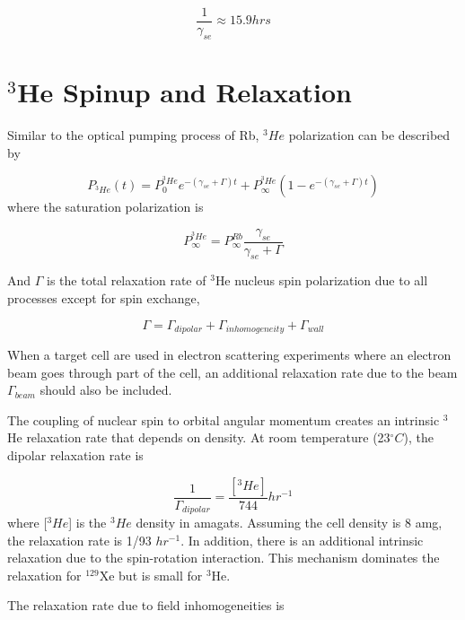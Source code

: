 \begin{equation}
\frac{1}{\gamma_{se}}\approx 15.9 hrs
\end{equation}

\section{$^{3}$He Spinup and Relaxation}

Similar to the optical pumping process of Rb, $^{3}He$ polarization can be described by

\begin{equation}
P_{^{3}He}(t)=P_{0}^{^{3}He}e^{-(\gamma_{se}+\Gamma)t}+P_{\infty}^{^{3}He}(1-e^{-(\gamma_{se}+\Gamma)t})
\end{equation}
where the saturation polarization is

\begin{equation}
P_{\infty}^{^{3}He}=P_{\infty}^{Rb}\frac{\gamma_{se}}{\gamma_{se}+\Gamma}
\end{equation}

And $\Gamma$ is the total relaxation rate of $^{3}$He nucleus spin polarization due to all processes except for spin exchange,

\begin{equation}
\Gamma=\Gamma_{dipolar}+\Gamma_{inhomogeneity}+\Gamma_{wall}
\end{equation}

When a target cell are used in electron scattering experiments where an electron beam goes through part of the cell, an additional relaxation rate due to the beam $\Gamma_{beam}$ should also be included.

The coupling of nuclear spin to orbital angular momentum creates an intrinsic $^{3}$He relaxation rate that depends on density. At room temperature (23$^{\circ}C$), the dipolar relaxation rate is~\cite{PhysRevLett.67.3219} 

\begin{equation}
\frac{1}{\Gamma_{dipolar}}=\frac{[^{3}He]}{744}hr^{-1}
\end{equation}
where [$^{3}He$] is the $^{3}He$ density in amagats. Assuming the cell density is 8 amg, the relaxation rate is 1/93 $hr^{-1}$. In addition, there is an additional intrinsic relaxation due to the spin-rotation interaction. This mechanism dominates the relaxation for $^{129}$Xe but is small for $^{3}$He. 

The relaxation rate due to field inhomogeneities is~\cite{PhysRev.138.A946, PhysRev.139.A1398, PhysRevA.37.2877}

